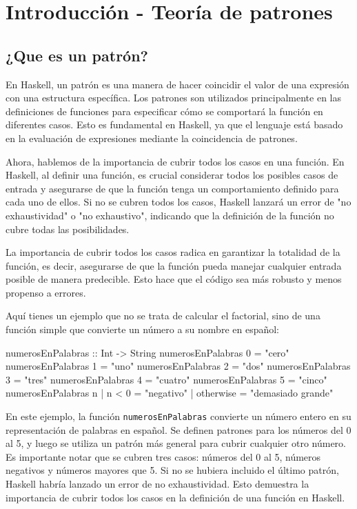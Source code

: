 \documentclass{article}
\begin{document}
\section{Introducción - Teoría de patrones}

\subsection{¿Que es un patrón?}
En Haskell, un patrón es una manera de hacer coincidir el valor de una expresión con una estructura específica. Los patrones son utilizados principalmente en las definiciones de funciones para especificar cómo se comportará la función en diferentes casos. Esto es fundamental en Haskell, ya que el lenguaje está basado en la evaluación de expresiones mediante la coincidencia de patrones.

Ahora, hablemos de la importancia de cubrir todos los casos en una función. En Haskell, al definir una función, es crucial considerar todos los posibles casos de entrada y asegurarse de que la función tenga un comportamiento definido para cada uno de ellos. Si no se cubren todos los casos, Haskell lanzará un error de "no exhaustividad" o "no exhaustivo", indicando que la definición de la función no cubre todas las posibilidades.

La importancia de cubrir todos los casos radica en garantizar la totalidad de la función, es decir, asegurarse de que la función pueda manejar cualquier entrada posible de manera predecible. Esto hace que el código sea más robusto y menos propenso a errores.

Aquí tienes un ejemplo que no se trata de calcular el factorial, sino de una función simple que convierte un número a su nombre en español:

\begin{haskell}[caption={Función que convierte un número del 0 al 5 a su nombre en español}]
numerosEnPalabras :: Int -> String
numerosEnPalabras 0 = "cero"
numerosEnPalabras 1 = "uno"
numerosEnPalabras 2 = "dos"
numerosEnPalabras 3 = "tres"
numerosEnPalabras 4 = "cuatro"
numerosEnPalabras 5 = "cinco"
numerosEnPalabras n
    | n < 0     = "negativo"
    | otherwise = "demasiado grande"
\end{haskell}

En este ejemplo, la función \texttt{numerosEnPalabras} convierte un número entero en su representación de palabras en español. Se definen patrones para los números del 0 al 5, y luego se utiliza un patrón más general para cubrir cualquier otro número. Es importante notar que se cubren tres casos: números del 0 al 5, números negativos y números mayores que 5. Si no se hubiera incluido el último patrón, Haskell habría lanzado un error de no exhaustividad. Esto demuestra la importancia de cubrir todos los casos en la definición de una función en Haskell.
\end{document}
